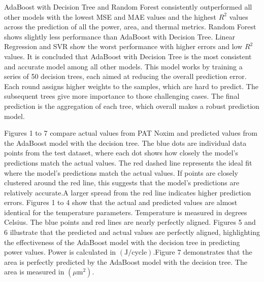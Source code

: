 \documentclass[conference]{IEEEtran}
\begin{document}
	AdaBoost with Decision Tree and Random Forest consistently outperformed all other models with the lowest MSE and MAE values and the highest $R^2$ values across the prediction of all the power, area, and thermal metrics. Random Forest shows slightly less performance than AdaBoost with Decision Tree. Linear Regression and SVR show the worst performance with higher errors and low $R^2$ values. It is concluded that AdaBoost with Decision Tree is the most consistent and accurate model among all other models. This model works by training a series of 50 decision trees, each aimed at reducing the overall prediction error. Each round assigns higher weights to the samples, which are hard to predict. The subsequent trees give more importance to those challenging cases. The final prediction is the aggregation of each tree, which overall makes a robust prediction model. 

	Figures 1 to 7 compare actual values from PAT Noxim and predicted values from the AdaBoost model with the decision tree. The blue dots are individual data points from the test dataset, where each dot shows how closely the model’s predictions match the actual values. The red dashed line represents the ideal fit where the model’s predictions match the actual values. If points are closely clustered around the red line, this suggests that the model’s predictions are relatively accurate.A larger spread from the red line indicates higher prediction errors. Figures 1 to 4 show that the actual and predicted values are almost identical for the temperature parameters. Temperature is measured in degrees Celsius. The blue points and red lines are nearly perfectly aligned. Figures 5 and 6 illustrate that the predicted and actual values are perfectly aligned, highlighting the effectiveness of the AdaBoost model with the decision tree in predicting power values. Power is calculated in \((\text{J/cycle})\).Figure 7 demonstrates that the area is perfectly predicted by the AdaBoost model with the decision tree. The area is measured in \((\mu\text{m}^2)\).
\end{document}
